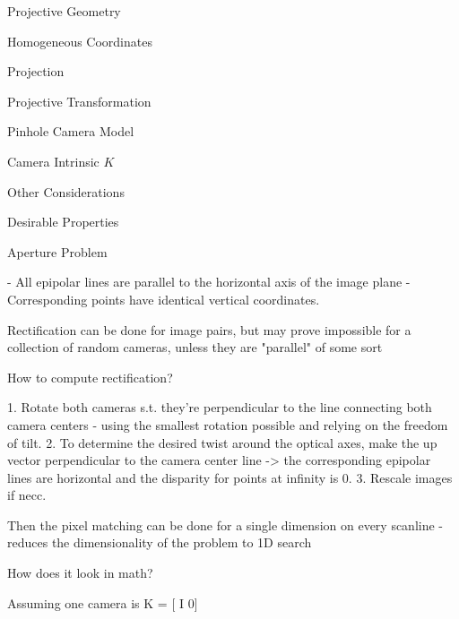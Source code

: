 \begin{section}
\begin{subsubsection}
\begin{subsubsection}
\begin{subsubsection}
\begin{section}{Projective Geometry}
\begin{subsection}{Homogeneous Coordinates}
\begin{subsubsection}
{\begin{subsubsection}{Projection}
\begin{subsubsection}{Projective Transformation}
\begin{subsection}
\begin{subsubsection}
\begin{subsubsection}
\begin{subsubsection}
{\begin{subsubsection}
\begin{subsection}
\begin{subsection} {Pinhole Camera Model}
\begin{subsection} {Camera Intrinsic $K$}
\begin{subsection}
\begin{subsection}
\begin{subsubsection}{Other Considerations}
{\begin{subsection}
\begin{subsubsection}{Desirable Properties}
\begin{section}
\begin{subsection}
\begin{subsection}
\begin{subsection}
\begin{section}
\begin{subsection}
\begin{subsubsection}
\begin{subsubsection}
\begin{subsection}
\begin{section}
\begin{subsection}
\begin{subsubsection}{Aperture Problem}
\begin{subsubsection}
{\begin{section}
\begin{subsubsection}
\begin{subsubsection}
\begin{subsubsection}
\begin{subsection}
\begin{subsection}
\begin{subsection}
\begin{subsection}
\begin{subsection}
\begin{subsection}
\begin{subsection}
{\begin{section}
\begin{subsection}
\begin{subsection}
\begin{subsection}
- All epipolar lines are parallel to the horizontal axis of the image plane
- Corresponding points have identical vertical coordinates.

Rectification can be done for image pairs, but may prove impossible for a collection of random cameras, unless they are "parallel" of some sort

How to compute rectification?

1. Rotate both cameras s.t. they're perpendicular to the line connecting both camera centers - using the smallest rotation possible and relying on the freedom of tilt. 
2. To determine the desired twist around the optical axes, make the up vector perpendicular to the camera center line -> the corresponding epipolar lines are horizontal and the disparity for points at infinity is 0. 
3. Rescale images if necc.

Then the pixel matching can be done for a single dimension on every scanline - reduces the dimensionality of the problem to 1D search

\begin{subsubsection} How does it look in math?

Assuming one camera is K = [ I 0]


\end{subsubsection}
\end{subsection}
\end{subsection}
\end{subsection}
\end{section}}
\end{subsection}
\end{subsection}
\end{subsection}
\end{subsection}
\end{subsection}
\end{subsection}
\end{subsection}
\end{subsubsection}
\end{subsubsection}
\end{subsubsection}
\end{section}}
\end{subsubsection}
\end{subsubsection}
\end{subsection}
\end{section}
\end{subsection}
\end{subsubsection}
\end{subsubsection}
\end{subsection}
\end{section}
\end{subsection}
\end{subsection}
\end{subsection}
\end{section}
\end{subsubsection}
\end{subsection}}
\end{subsubsection}
\end{subsection}
\end{subsection}
\end{subsection}
\end{subsection}
\end{subsection}
\end{subsubsection}}
\end{subsubsection}
\end{subsubsection}
\end{subsubsection}
\end{subsection}
\end{subsubsection}
\end{subsubsection}}
\end{subsubsection}
\end{subsection}
\end{section}
\end{subsubsection}
\end{subsubsection}
\end{subsubsection}
\end{section}
